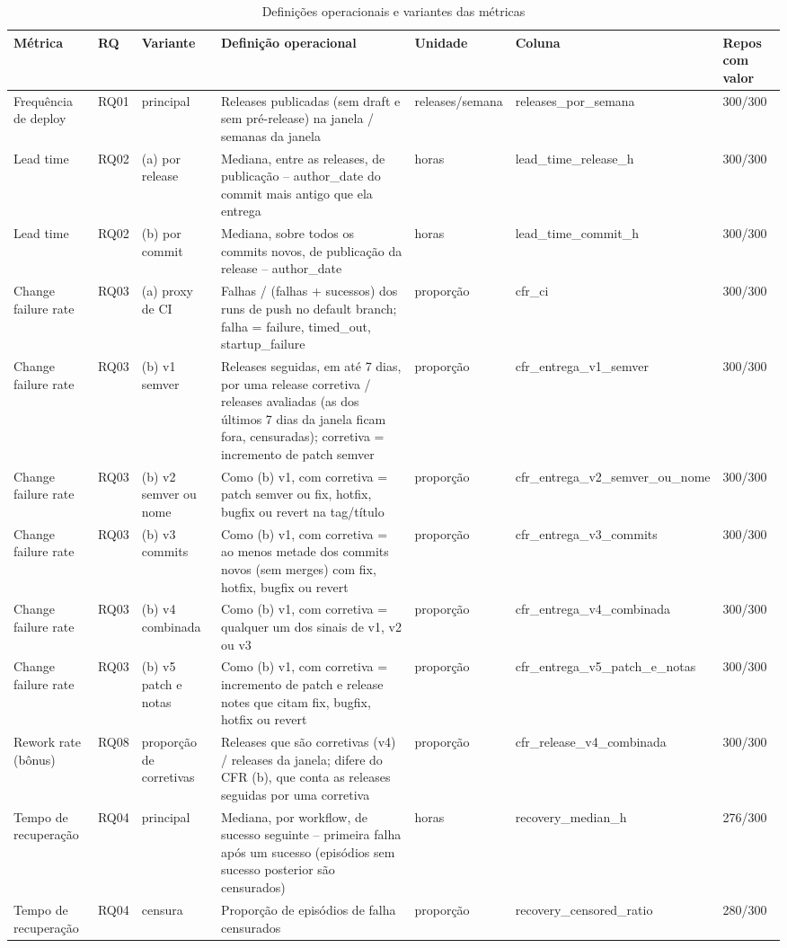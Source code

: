 \begin{table}[htbp]
\centering
\caption{Definições operacionais e variantes das métricas}
\label{tab:definicoes}
\begin{tabular}{lllp{6cm}lll}
\hline
Métrica & RQ & Variante & Definição operacional & Unidade & Coluna & Repos com valor \\
\hline
Frequência de deploy & RQ01 & principal & Releases publicadas (sem draft e sem pré-release) na janela / semanas da janela & releases/semana & releases\_por\_semana & 300/300 \\
Lead time & RQ02 & (a) por release & Mediana, entre as releases, de publicação -- author\_date do commit mais antigo que ela entrega & horas & lead\_time\_release\_h & 300/300 \\
Lead time & RQ02 & (b) por commit & Mediana, sobre todos os commits novos, de publicação da release -- author\_date & horas & lead\_time\_commit\_h & 300/300 \\
Change failure rate & RQ03 & (a) proxy de CI & Falhas / (falhas + sucessos) dos runs de push no default branch; falha = failure, timed\_out, startup\_failure & proporção & cfr\_ci & 300/300 \\
Change failure rate & RQ03 & (b) v1 semver & Releases seguidas, em até 7 dias, por uma release corretiva / releases avaliadas (as dos últimos 7 dias da janela ficam fora, censuradas); corretiva = incremento de patch semver & proporção & cfr\_entrega\_v1\_semver & 300/300 \\
Change failure rate & RQ03 & (b) v2 semver ou nome & Como (b) v1, com corretiva = patch semver ou fix, hotfix, bugfix ou revert na tag/título & proporção & cfr\_entrega\_v2\_semver\_ou\_nome & 300/300 \\
Change failure rate & RQ03 & (b) v3 commits & Como (b) v1, com corretiva = ao menos metade dos commits novos (sem merges) com fix, hotfix, bugfix ou revert & proporção & cfr\_entrega\_v3\_commits & 300/300 \\
Change failure rate & RQ03 & (b) v4 combinada & Como (b) v1, com corretiva = qualquer um dos sinais de v1, v2 ou v3 & proporção & cfr\_entrega\_v4\_combinada & 300/300 \\
Change failure rate & RQ03 & (b) v5 patch e notas & Como (b) v1, com corretiva = incremento de patch e release notes que citam fix, bugfix, hotfix ou revert & proporção & cfr\_entrega\_v5\_patch\_e\_notas & 300/300 \\
Rework rate (bônus) & RQ08 & proporção de corretivas & Releases que são corretivas (v4) / releases da janela; difere do CFR (b), que conta as releases seguidas por uma corretiva & proporção & cfr\_release\_v4\_combinada & 300/300 \\
Tempo de recuperação & RQ04 & principal & Mediana, por workflow, de sucesso seguinte -- primeira falha após um sucesso (episódios sem sucesso posterior são censurados) & horas & recovery\_median\_h & 276/300 \\
Tempo de recuperação & RQ04 & censura & Proporção de episódios de falha censurados & proporção & recovery\_censored\_ratio & 280/300 \\
\hline
\end{tabular}
\end{table}
